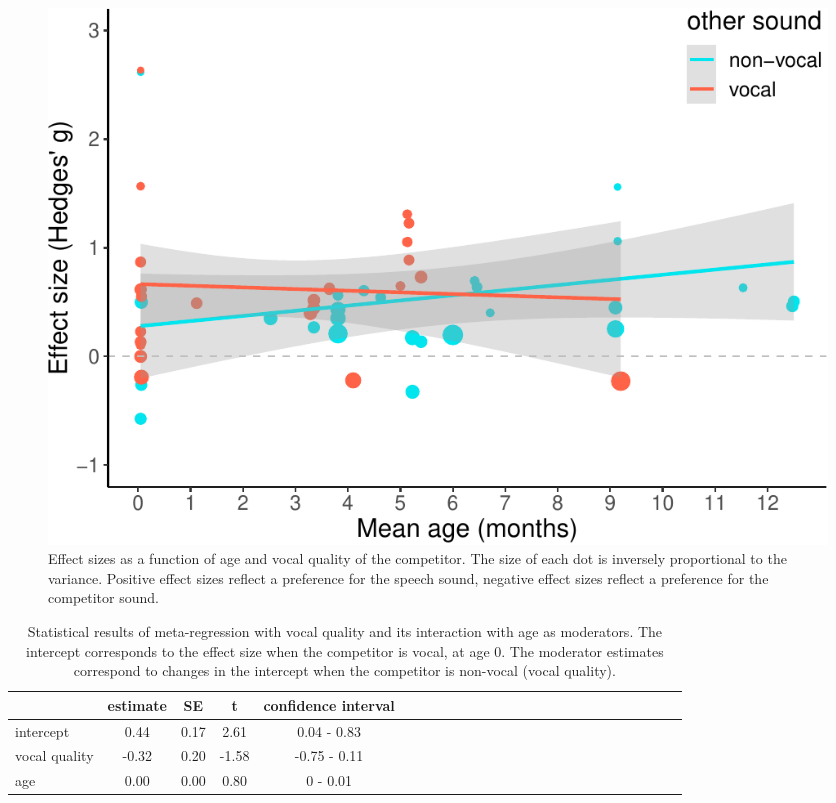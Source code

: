 \documentclass[man]{apa6}
\begin{document}
\begin{figure}
\centering
\includegraphics{MA_speech_pref_files/figure-latex/vocal-1.pdf}
\caption{\label{fig:vocal}Effect sizes as a function of age and vocal
quality of the competitor. The size of each dot is inversely
proportional to the variance. Positive effect sizes reflect a preference
for the speech sound, negative effect sizes reflect a preference for the
competitor sound.}
\end{figure}

\begin{table}[tbp]
\begin{center}
\begin{threeparttable}
\caption{\label{tab:TableVocal}Statistical results of meta-regression with vocal quality and its interaction with age as moderators. The intercept corresponds to the effect size when the competitor is vocal, at age 0. The moderator estimates correspond to changes in the intercept when the competitor is non-vocal (vocal quality).}
\begin{tabular}{lcccclcccclcccclcccclcccc}
\toprule
 & estimate & SE & t & confidence interval\\
\midrule
intercept & 0.44 & 0.17 & 2.61 & 0.04 - 0.83\\
vocal quality & -0.32 & 0.20 & -1.58 & -0.75 - 0.11\\
age & 0.00 & 0.00 & 0.80 & 0 - 0.01\\
\bottomrule
\end{tabular}
\end{threeparttable}
\end{center}
\end{table}
\end{document}
